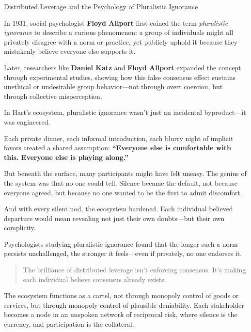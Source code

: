 \begin{PsychologySidebar}{Distributed Leverage and the Psychology of Pluralistic Ignorance}

  In 1931, social psychologist \textbf{Floyd Allport} first coined the term \emph{pluralistic ignorance} to describe a curious phenomenon: a group of individuals might all privately disagree with a norm or practice, yet publicly uphold it because they mistakenly believe everyone else supports it.

  Later, researchers like \textbf{Daniel Katz} and \textbf{Floyd Allport} expanded the concept through experimental studies, showing how this false consensus effect sustains unethical or undesirable group behavior—not through overt coercion, but through collective misperception.

  In Hart’s ecosystem, pluralistic ignorance wasn’t just an incidental byproduct—it was engineered.

  Each private dinner, each informal introduction, each blurry night of implicit favors created a shared assumption: \textbf{“Everyone else is comfortable with this. Everyone else is playing along.”}

  But beneath the surface, many participants might have felt uneasy. The genius of the system was that no one could tell. Silence became the default, not because everyone agreed, but because no one wanted to be the first to admit discomfort.

  \medskip

  And with every silent nod, the ecosystem hardened. Each individual believed departure would mean revealing not just their own doubts—but their own complicity.

  \medskip

  Psychologists studying pluralistic ignorance found that the longer such a norm persists unchallenged, the stronger it feels—even if privately, no one endorses it.

  \begin{quote}
  The brilliance of distributed leverage isn’t enforcing consensus.  It’s making each individual believe consensus already exists.
  \end{quote}

\end{PsychologySidebar}

The ecosystem functions as a cartel, not through monopoly control of goods or services, but through monopoly control of plausible deniability. Each stakeholder becomes a node in an unspoken network of reciprocal risk, where silence is the currency, and participation is the collateral.

